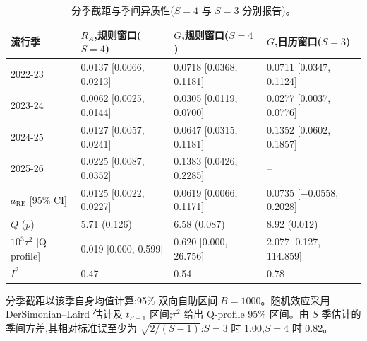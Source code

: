 \begin{table}[htbp]
\centering
\footnotesize
\caption{分季截距与季间异质性($S=4$ 与 $S=3$ 分别报告)。}
\label{tab:s5}
\begin{tabular}{llll}
\toprule
流行季 & $R_A$,规则窗口($S=4$) & $G$,规则窗口($S=4$) & $G$,日历窗口($S=3$) \\
\midrule
2022-23 & 0.0137 [0.0066, 0.0213] & 0.0718 [0.0368, 0.1181] & 0.0711 [0.0347, 0.1124] \\
2023-24 & 0.0062 [0.0025, 0.0144] & 0.0305 [0.0119, 0.0700] & 0.0277 [0.0037, 0.0776] \\
2024-25 & 0.0127 [0.0057, 0.0241] & 0.0647 [0.0315, 0.1181] & 0.1352 [0.0602, 0.1857] \\
2025-26 & 0.0225 [0.0087, 0.0352] & 0.1383 [0.0426, 0.2285] & -- \\
$a_{\mathrm{RE}}$ [95\% CI] & 0.0125 [0.0022, 0.0227] & 0.0619 [0.0066, 0.1171] & 0.0735 [$-$0.0558, 0.2028] \\
$Q$ ($p$) & 5.71 (0.126) & 6.58 (0.087) & 8.92 (0.012) \\
$10^3\tau^2$ [Q-profile] & 0.019 [0.000, 0.599] & 0.620 [0.000, 26.756] & 2.077 [0.127, 114.859] \\
$I^2$ & 0.47 & 0.54 & 0.78 \\
\bottomrule
\end{tabular}
\par\smallskip
\begin{minipage}{0.95\linewidth}\scriptsize 分季截距以该季自身均值计算;95\% 双向自助区间,$B=1000$。随机效应采用 DerSimonian--Laird 估计及 $t_{S-1}$ 区间;$\tau^2$ 给出 Q-profile 95\% 区间。由 $S$ 季估计的季间方差,其相对标准误至少为 $\sqrt{2/(S-1)}$:$S=3$ 时 1.00,$S=4$ 时 0.82。\end{minipage}
\end{table}

